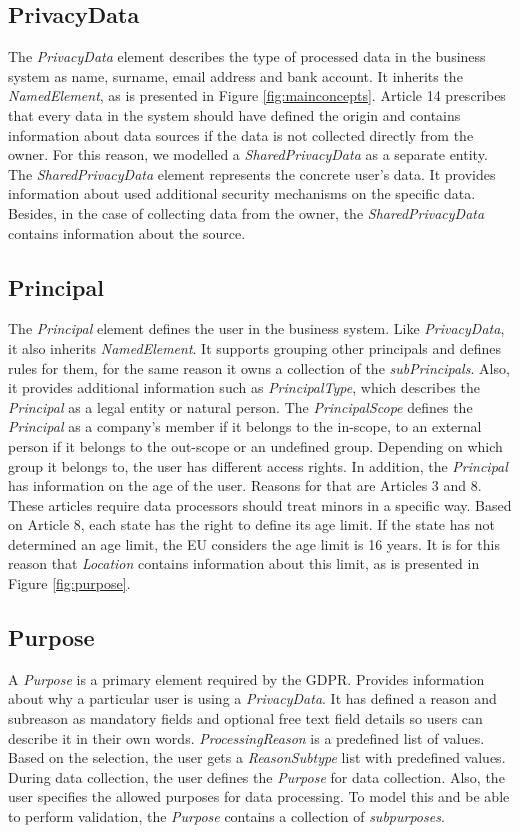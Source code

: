 \documentclass[11pt,english]{article}
\begin{document}
\subsection{PrivacyData}
The \emph{PrivacyData} element describes the type of processed data in the business system as name, surname, email address and bank account. It inherits the \emph{NamedElement}, as is presented in Figure \ref{fig:mainconcepts}. Article 14 prescribes that every data in the system should have defined the origin and contains information about data sources if the data is not collected directly from the owner. For this reason, we modelled a \emph{SharedPrivacyData} as a separate entity. The \emph{SharedPrivacyData} element represents the concrete user's data. It provides information about used additional security mechanisms on the specific data. Besides, in the case of collecting data from the owner, the \emph{SharedPrivacyData} contains information about the source.
\subsection{Principal}
The \emph{Principal} element defines the user in the business system. Like \emph{PrivacyData}, it also inherits \emph{NamedElement}. It supports grouping other principals and defines rules for them, for the same reason it owns a collection of the \emph{subPrincipals}. Also, it provides additional information such as \emph{PrincipalType}, which describes the \emph{Principal} as a legal entity or natural person. The \emph{PrincipalScope} defines the \emph{Principal} as a company's member if it belongs to the in-scope, to an external person if it belongs to the out-scope or an undefined group. Depending on which group it belongs to, the user has different access rights. In addition, the \emph{Principal} has information on the age of the user. 
Reasons for that are Articles 3 and 8. These articles require 
data processors should treat minors in a specific way. Based on Article 8, each state has the right to define its age limit. If the state has not determined an age limit, the EU considers the age limit is 16 years. It is for this reason that \emph{Location} contains information about this limit, as is presented in Figure \ref{fig:purpose}.
\subsection{Purpose}
A \emph{Purpose} is a primary element required by the GDPR. Provides information about why a particular user is using a \emph{PrivacyData}. It has defined a reason and subreason as mandatory fields and optional free text field details so users can describe it in their own words. \emph{ProcessingReason} is a predefined list of values. Based on the selection, the user gets a \emph{ReasonSubtype} list with predefined values. During data collection, the user defines the \emph{Purpose} for data collection. Also, the user specifies the allowed purposes for data processing. To model this and be able to perform validation, the \emph{Purpose} contains a collection of \emph{subpurposes}. 
\end{document}

